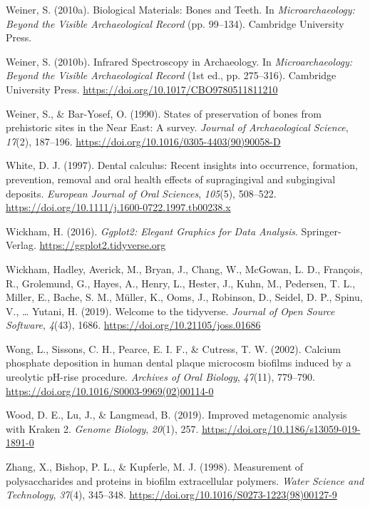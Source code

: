 \documentclass[
]{article}
\newlength{\cslhangindent}
\newlength{\cslentryspacingunit} %
\newenvironment{CSLReferences}[2] %
 {%
  \setlength{\parindent}{0pt}
  \ifodd #1
  \let\oldpar\par
  \def\par{\hangindent=\cslhangindent\oldpar}
  \fi
  \setlength{\parskip}{#2\cslentryspacingunit}
 }%
 {}
\begin{document}
\begin{CSLReferences}{1}{0}
\leavevmode{}%
Weiner, S. (2010a). Biological {Materials}: {Bones} and {Teeth}. In
\emph{Microarchaeology: {Beyond} the {Visible Archaeological Record}}
(pp. 99--134). {Cambridge University Press}.

\leavevmode{}%
Weiner, S. (2010b). Infrared {Spectroscopy} in {Archaeology}. In
\emph{Microarchaeology: {Beyond} the {Visible Archaeological Record}}
(1st ed., pp. 275--316). {Cambridge University Press}.
\url{https://doi.org/10.1017/CBO9780511811210}

\leavevmode{}%
Weiner, S., \& Bar-Yosef, O. (1990). States of preservation of bones
from prehistoric sites in the {Near East}: {A} survey. \emph{Journal of
Archaeological Science}, \emph{17}(2), 187--196.
\url{https://doi.org/10.1016/0305-4403(90)90058-D}

\leavevmode{}%
White, D. J. (1997). Dental calculus: Recent insights into occurrence,
formation, prevention, removal and oral health effects of supragingival
and subgingival deposits. \emph{European Journal of Oral Sciences},
\emph{105}(5), 508--522.
\url{https://doi.org/10.1111/j.1600-0722.1997.tb00238.x}

\leavevmode{}%
Wickham, H. (2016). \emph{Ggplot2: {Elegant Graphics} for {Data
Analysis}}. {Springer-Verlag}. \url{https://ggplot2.tidyverse.org}

\leavevmode{}%
Wickham, Hadley, Averick, M., Bryan, J., Chang, W., McGowan, L. D.,
François, R., Grolemund, G., Hayes, A., Henry, L., Hester, J., Kuhn, M.,
Pedersen, T. L., Miller, E., Bache, S. M., Müller, K., Ooms, J.,
Robinson, D., Seidel, D. P., Spinu, V., \ldots{} Yutani, H. (2019).
Welcome to the {tidyverse}. \emph{Journal of Open Source Software},
\emph{4}(43), 1686. \url{https://doi.org/10.21105/joss.01686}

\leavevmode{}%
Wong, L., Sissons, C. H., Pearce, E. I. F., \& Cutress, T. W. (2002).
Calcium phosphate deposition in human dental plaque microcosm biofilms
induced by a ureolytic {pH-rise} procedure. \emph{Archives of Oral
Biology}, \emph{47}(11), 779--790.
\url{https://doi.org/10.1016/S0003-9969(02)00114-0}

\leavevmode{}%
Wood, D. E., Lu, J., \& Langmead, B. (2019). Improved metagenomic
analysis with {Kraken} 2. \emph{Genome Biology}, \emph{20}(1), 257.
\url{https://doi.org/10.1186/s13059-019-1891-0}

\leavevmode{}%
Zhang, X., Bishop, P. L., \& Kupferle, M. J. (1998). Measurement of
polysaccharides and proteins in biofilm extracellular polymers.
\emph{Water Science and Technology}, \emph{37}(4), 345--348.
\url{https://doi.org/10.1016/S0273-1223(98)00127-9}

\end{CSLReferences}
\end{document}
